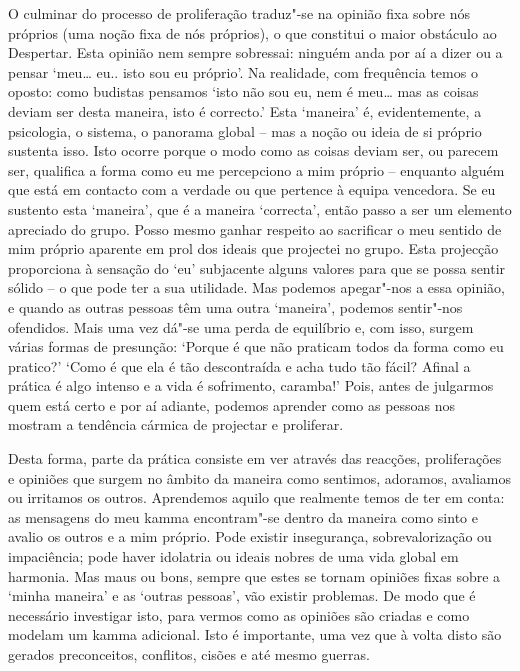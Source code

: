 O culminar do processo de proliferação traduz"-se na opinião fixa sobre nós próprios (uma noção fixa de nós próprios), o que constitui o maior obstáculo ao Despertar. Esta opinião nem sempre sobressai: ninguém anda por aí a dizer ou a pensar `meu\ldots{} eu.. isto sou eu próprio'. Na realidade, com frequência temos o oposto: como budistas pensamos `isto não sou eu, nem é meu\ldots{} mas as coisas deviam ser desta maneira, isto é correcto.' Esta `maneira' é, evidentemente, a psicologia, o sistema, o panorama global -- mas a noção ou ideia de si próprio sustenta isso. Isto ocorre porque o modo como as coisas deviam ser, ou parecem ser, qualifica a forma como eu me percepciono a mim próprio -- enquanto alguém que está em contacto com a verdade ou que pertence à equipa vencedora. Se eu sustento esta `maneira', que é a maneira `correcta', então passo a ser um elemento apreciado do grupo. Posso mesmo ganhar respeito ao sacrificar o meu sentido de mim próprio aparente em prol dos ideais que projectei no grupo. Esta projecção proporciona à sensação do `eu' subjacente alguns valores para que se possa sentir sólido -- o que pode ter a sua utilidade. Mas podemos apegar"-nos a essa opinião, e quando as outras pessoas têm uma outra `maneira', podemos sentir"-nos ofendidos. Mais uma vez dá"-se uma perda de equilíbrio e, com isso, surgem várias formas de presunção: `Porque é que não praticam todos da forma como eu pratico?' `Como é que ela é tão descontraída e acha tudo tão fácil? Afinal a prática é algo intenso e a vida é sofrimento, caramba!' Pois, antes de julgarmos quem está certo e por aí adiante, podemos aprender como as pessoas nos mostram a tendência cármica de projectar e proliferar.

Desta forma, parte da prática consiste em ver através das reacções, proliferações e opiniões que surgem no âmbito da maneira como sentimos, adoramos, avaliamos ou irritamos os outros. Aprendemos aquilo que realmente temos de ter em conta: as mensagens do meu kamma encontram"-se dentro da maneira como sinto e avalio os outros e a mim próprio. Pode existir insegurança, sobrevalorização ou impaciência; pode haver idolatria ou ideais nobres de uma vida global em harmonia. Mas maus ou bons, sempre que estes se tornam opiniões fixas sobre a `minha maneira' e as `outras pessoas', vão existir problemas. De modo que é necessário investigar isto, para vermos como as opiniões são criadas e como modelam um kamma adicional. Isto é importante, uma vez que à volta disto são gerados preconceitos, conflitos, cisões e até mesmo guerras.

